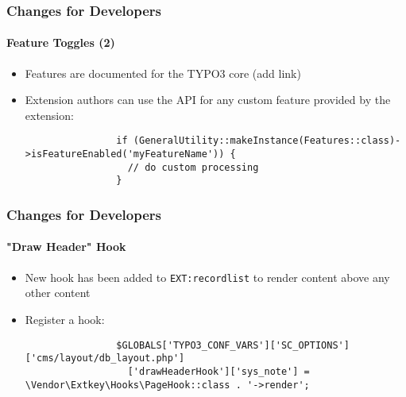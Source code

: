 \begin{frame}[fragile]
	\frametitle{Changes for Developers}
	\framesubtitle{Feature Toggles (2)}

	\lstset{basicstyle=\tiny\ttfamily}

	\begin{itemize}

		\item Features are documented for the TYPO3 core\newline
			\small
				(add link)
			\normalsize

		\item Extension authors can use the API for any custom feature provided
			by the extension:

			\begin{lstlisting}
				if (GeneralUtility::makeInstance(Features::class)->isFeatureEnabled('myFeatureName')) {
				  // do custom processing
				}
			\end{lstlisting}

	\end{itemize}

\end{frame}


\begin{frame}[fragile]
	\frametitle{Changes for Developers}
	\framesubtitle{"Draw Header" Hook}

	\lstset{basicstyle=\tiny\ttfamily}

	\begin{itemize}
		\item New hook has been added to \texttt{EXT:recordlist}
			to render content above any other content

		\item Register a hook:

			\begin{lstlisting}
				$GLOBALS['TYPO3_CONF_VARS']['SC_OPTIONS']['cms/layout/db_layout.php']
				  ['drawHeaderHook']['sys_note'] = \Vendor\Extkey\Hooks\PageHook::class . '->render';
			\end{lstlisting}

	\end{itemize}

\end{frame}

